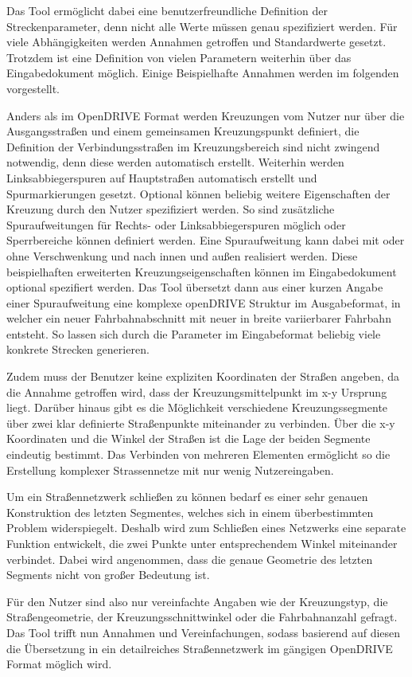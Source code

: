 Das Tool ermöglicht dabei eine benutzerfreundliche Definition der Streckenparameter, denn nicht alle Werte müssen genau spezifiziert werden. Für viele Abhängigkeiten werden Annahmen getroffen und Standardwerte gesetzt. Trotzdem ist eine Definition von vielen Parametern weiterhin über das Eingabedokument möglich. Einige Beispielhafte Annahmen werden im folgenden vorgestellt.

Anders als im OpenDRIVE Format werden Kreuzungen vom Nutzer nur über die Ausgangsstraßen und einem gemeinsamen Kreuzungspunkt definiert, die Definition der Verbindungsstraßen im Kreuzungsbereich sind nicht zwingend notwendig, denn diese werden automatisch erstellt. Weiterhin werden Linksabbiegerspuren auf Hauptstraßen automatisch erstellt und Spurmarkierungen gesetzt. Optional können beliebig weitere Eigenschaften der Kreuzung durch den Nutzer spezifiziert werden. So sind zusätzliche Spuraufweitungen für Rechts- oder Linksabbiegerspuren möglich oder Sperrbereiche können definiert werden. Eine Spuraufweitung kann dabei mit oder ohne Verschwenkung und nach innen und außen realisiert werden. Diese beispielhaften erweiterten Kreuzungseigenschaften können im Eingabedokument optional spezifiert werden. Das Tool übersetzt dann aus einer kurzen Angabe einer Spuraufweitung eine komplexe openDRIVE Struktur im Ausgabeformat, in welcher ein neuer Fahrbahnabschnitt mit neuer in breite variierbarer Fahrbahn entsteht. So lassen sich durch die Parameter im Eingabeformat beliebig viele konkrete Strecken generieren.

Zudem muss der Benutzer keine expliziten Koordinaten der Straßen angeben, da die Annahme getroffen wird, dass der Kreuzungsmittelpunkt im x-y Ursprung liegt. Darüber hinaus gibt es die Möglichkeit verschiedene Kreuzungssegmente über zwei klar definierte Straßenpunkte miteinander zu verbinden. Über die x-y Koordinaten und die Winkel der Straßen ist die Lage der beiden Segmente eindeutig bestimmt. Das Verbinden von mehreren Elementen ermöglicht so die Erstellung komplexer Strassennetze mit nur wenig Nutzereingaben.

Um ein Straßennetzwerk schließen zu können bedarf es einer sehr genauen Konstruktion des letzten Segmentes, welches sich in einem überbestimmten Problem widerspiegelt. Deshalb wird zum Schließen eines Netzwerks eine separate Funktion entwickelt, die zwei Punkte unter entsprechendem Winkel miteinander verbindet. Dabei wird angenommen, dass die genaue Geometrie des letzten Segments nicht von großer Bedeutung ist.

Für den Nutzer sind also nur vereinfachte Angaben wie der Kreuzungstyp, die Straßengeometrie, der Kreuzungsschnittwinkel oder die Fahrbahnanzahl gefragt. Das Tool trifft nun Annahmen und Vereinfachungen, sodass basierend auf diesen die Übersetzung in ein detailreiches Straßennetzwerk im gängigen OpenDRIVE Format möglich wird.

